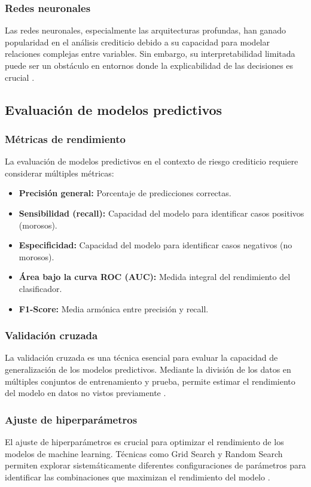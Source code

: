 \subsubsection{Redes neuronales}
Las redes neuronales, especialmente las arquitecturas profundas, han ganado popularidad en el análisis crediticio debido a su capacidad para modelar relaciones complejas entre variables. Sin embargo, su interpretabilidad limitada puede ser un obstáculo en entornos donde la explicabilidad de las decisiones es crucial \citep{xia2017novel}.

\subsection{Evaluación de modelos predictivos}
\subsubsection{Métricas de rendimiento}
La evaluación de modelos predictivos en el contexto de riesgo crediticio requiere considerar múltiples métricas:

\begin{itemize}
    \item \textbf{Precisión general:} Porcentaje de predicciones correctas.
    \item \textbf{Sensibilidad (recall):} Capacidad del modelo para identificar casos positivos (morosos).
    \item \textbf{Especificidad:} Capacidad del modelo para identificar casos negativos (no morosos).
    \item \textbf{Área bajo la curva ROC (AUC):} Medida integral del rendimiento del clasificador.
    \item \textbf{F1-Score:} Media armónica entre precisión y recall.
\end{itemize}

\subsubsection{Validación cruzada}
La validación cruzada es una técnica esencial para evaluar la capacidad de generalización de los modelos predictivos. Mediante la división de los datos en múltiples conjuntos de entrenamiento y prueba, permite estimar el rendimiento del modelo en datos no vistos previamente \citep{hernandez2020metodologia}.

\subsubsection{Ajuste de hiperparámetros}
El ajuste de hiperparámetros es crucial para optimizar el rendimiento de los modelos de machine learning. Técnicas como Grid Search y Random Search permiten explorar sistemáticamente diferentes configuraciones de parámetros para identificar las combinaciones que maximizan el rendimiento del modelo \citep{kim2022credit}.

